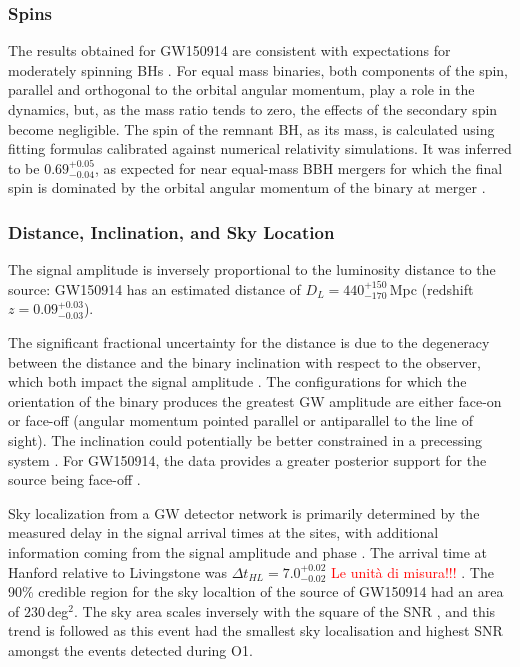 \documentclass[binding=0.6cm, LaM]{sapthesis}
\newcommand{\fpg}[1]{\textcolor{red}{#1} }
\begin{document}
	\subsubsection{Spins}
	The results obtained for GW150914 are consistent with expectations for moderately spinning BHs \cite{101, 102}. 
	For equal mass binaries, both components of the spin, 
	parallel and orthogonal to the orbital angular momentum, 
	play a role in the dynamics, but, as the mass ratio tends to zero, 
	the effects of the secondary spin become negligible.
	The spin of the remnant BH, as its mass, is calculated using fitting formulas calibrated against numerical relativity simulations.  It was inferred to be $0.69^{+0.05}_{-0.04}$, as expected for near equal-mass BBH mergers for which the final spin is dominated by the orbital angular momentum of the binary at merger \cite{99, 100}.

	\subsubsection{Distance, Inclination, and Sky Location}
	The signal amplitude is inversely proportional to the luminosity distance to the source: 
	GW150914 has an estimated distance of $D_L = 440^{+150}_{-170}\,$Mpc (redshift $z=0.09^{+0.03}_{-0.03}$). 

	The significant fractional uncertainty for the distance is due to the degeneracy between the distance and the binary inclination with respect to the observer, which both impact the signal amplitude \cite{96-98}.
	The configurations for which the orientation of the binary produces the greatest GW amplitude 
	are either face-on or face-off (angular momentum pointed parallel or antiparallel to the line of sight). 
	The inclination could potentially be better constrained in a precessing system \cite{94, 95}. 
	For GW150914, the data provides a greater posterior support for the source being face-off \cite{93}.

	Sky localization from a GW detector network is primarily determined by the measured delay in the signal arrival times at the sites, 
	with additional information coming from the signal amplitude and phase \cite{91,92}. 
	The arrival time at Hanford relative to Livingstone was $\Delta t_{HL} = 7.0^{+0.02}_{-0.02}$ \fpg{Le unit\`a di misura!!!}.
	The 90\% credible region for the sky localtion of the source of GW150914 had an area of $230\,$deg$^2$.
	The sky area scales inversely with the square of the SNR \cite{89,90}, 
	and this trend is followed as this event had the smallest sky localisation and 
	highest SNR amongst the events detected during O1.
\end{document}
